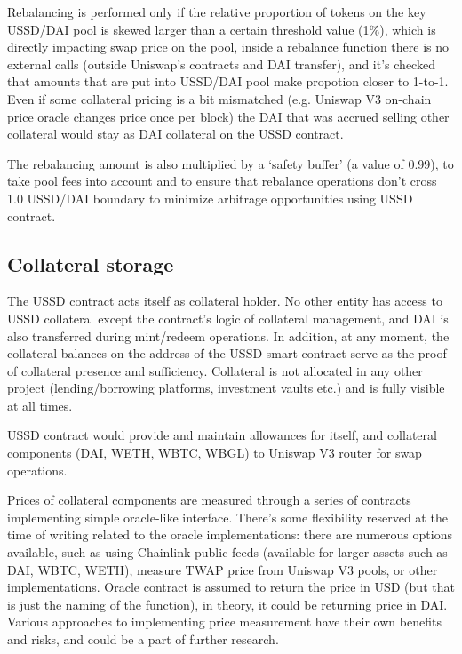 Rebalancing is performed only if the relative proportion of tokens on the key USSD/DAI pool is
skewed larger than a certain threshold value (1\%), which is directly impacting swap price on
the pool, inside a rebalance function there is no external calls (outside Uniswap's contracts
and DAI transfer), and it's checked that amounts that are put into USSD/DAI pool make propotion
closer to 1-to-1. Even if some collateral pricing is a bit mismatched (e.g. Uniswap V3 on-chain
price oracle changes price once per block) the DAI that was accrued selling other collateral
would stay as DAI collateral on the USSD contract.

The rebalancing amount is also multiplied by a `safety buffer' (a value of 0.99), to take pool
fees into account and to ensure that rebalance operations don't cross 1.0 USSD/DAI boundary
to minimize arbitrage opportunities using USSD contract.

\subsection{Collateral storage}

The USSD contract acts itself as collateral holder. No other entity has access to USSD 
collateral except the contract's logic of collateral management, and DAI is also 
transferred during mint/redeem operations. In addition, at any moment, the collateral 
balances on the address of the USSD smart-contract serve as the proof of collateral 
presence and sufficiency. Collateral is not allocated in any other project 
(lending/borrowing platforms, investment vaults etc.) and is fully visible at all times.

USSD contract would provide and maintain allowances for itself, and collateral components
(DAI, WETH, WBTC, WBGL) to Uniswap V3 router for swap operations.

Prices of collateral components are measured through a series of contracts implementing simple
oracle-like interface. There's some flexibility reserved at the time of writing related to
the oracle implementations: there are numerous options available, such as using Chainlink
public feeds (available for larger assets such as DAI, WBTC, WETH), measure TWAP price
from Uniswap V3 pools, or other implementations. Oracle contract is assumed to return the price
in USD (but that is just the naming of the function), in theory, it could be returning price
in DAI. Various approaches to implementing price measurement have their own benefits and risks,
and could be a part of further research.



